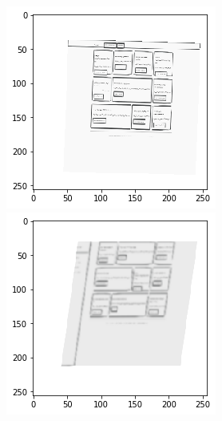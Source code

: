 \documentclass[pdftex,a4paper,halfparskip, article]{scrartcl}
\begin{document}
\begin{figure}
\centering
\begin{minipage}{.5\textwidth}
  \centering
  \includegraphics[width=0.8\linewidth]{skizze_aug_1}
\end{minipage}%
\begin{minipage}{.5\textwidth}
  \centering
  \includegraphics[width=0.8\linewidth]{skizze_aug_2}
\end{minipage}
  \label{fig:skizzen_aug}
\end{figure}
\end{document}
